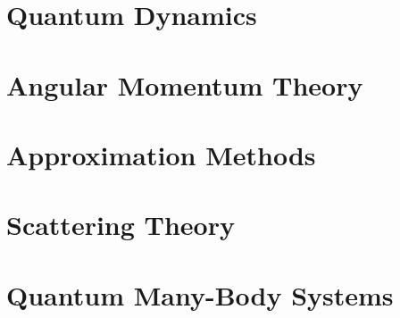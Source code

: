 \documentclass[11pt,a4paper,oneside,openany]{book}
\numberwithin{equation}{section}
\begin{document}
\chapter{Quantum Dynamics}\label{ch:quantum-dynamics}











\chapter{Angular Momentum Theory}\label{ch:angular-momentum}










\chapter{Approximation Methods}\label{ch:approximation-methods}








\chapter{Scattering Theory}\label{ch:scattering}






\chapter{Quantum Many-Body Systems}\label{ch:many-body}





\end{document}

